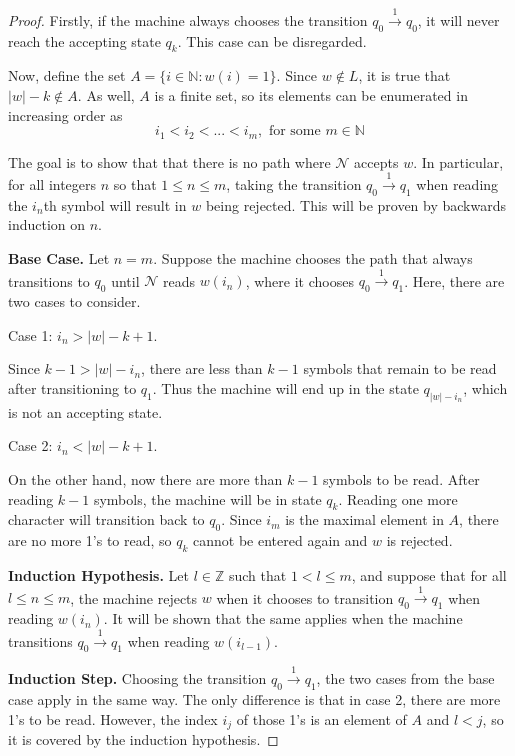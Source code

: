 \documentclass[11pt]{article}
\begin{document}
\begin{enumerate}[label=\textbf{Q\arabic*.}]
\begin{enumerate}[label=\textit{\alph*)}]
\begin{proof}
	Firstly, if the machine always chooses the transition \(q_0 \xrightarrow{1} q_0\), it will never reach the accepting state \(q_k\). This case can be disregarded.

	Now, define the set \(A = \{i \in \mathbb{N} : w(i) = 1\}\). Since \(w \notin L\), it is true that \(|w| - k \notin A\). As well, \(A\) is a finite set, so its elements can be enumerated in increasing order as
	\[
		i_1 < i_2 < ... < i_m, \text{ for some } m \in \mathbb{N}
	\]
	
	The goal is to show that that there is no path where \(\mathcal{N}\) accepts \(w\). In particular, for all integers \(n\) so that \(1 \leq n \leq m\), taking the transition \(q_0 \xrightarrow{1} q_1\) when reading the \(i_n\)th symbol will result in \(w\) being rejected. This will be proven by backwards induction on \(n\).

	\medskip

	\textbf{Base Case.} Let \(n = m\). Suppose the machine chooses the path that always transitions to \(q_0\) until \(\mathcal{N}\) reads \(w(i_n)\), where it chooses \(q_0 \xrightarrow{1} q_1\). Here, there are two cases to consider.

	Case 1: \(i_n > |w| - k + 1\).

	Since \(k - 1 > |w| - i_n\), there are less than \(k - 1\) symbols that remain to be read after transitioning to \(q_1\). Thus the machine will end up in the state \(q_{|w| - i_n}\), which is not an accepting state.

	Case 2: \(i_n < |w| - k + 1\).

	On the other hand, now there are more than \(k - 1\) symbols to be read. After reading \(k-1\) symbols, the machine will be in state \(q_k\). Reading one more character will transition back to \(q_0\). Since \(i_m\) is the maximal element in \(A\), there are no more 1's to read, so \(q_k\) cannot be entered again and \(w\) is rejected.

	\medskip

	\textbf{Induction Hypothesis.} Let \(l \in \mathbb{Z}\) such that \(1 < l \leq m\), and suppose that for all \(l \leq n \leq m\), the machine rejects \(w\) when it chooses to transition \(q_0 \xrightarrow{1} q_1\) when reading \(w(i_n)\). It will be shown that the same applies when the machine transitions \(q_0 \xrightarrow{1} q_1\) when reading \(w(i_{l-1})\).

	\medskip

	\textbf{Induction Step.} Choosing the transition \(q_0 \xrightarrow{1}q_1\), the two cases from the base case apply in the same way. The only difference is that in case 2, there are more 1's to be read. However, the index \(i_j\) of those 1's is an element of \(A\) and \(l < j\), so it is covered by the induction hypothesis.


\end{proof}
\end{enumerate}
\end{enumerate}
\end{document}
